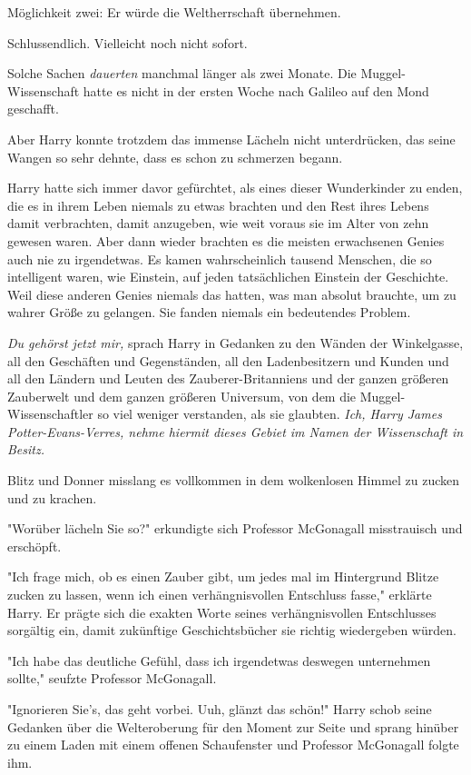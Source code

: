 {Möglichkeit zwei: Er würde die Weltherrschaft übernehmen.

Schlussendlich. Vielleicht noch nicht sofort.

Solche Sachen \emph{dauerten} manchmal länger als zwei Monate. Die Muggel-Wissenschaft hatte es nicht in der ersten Woche nach Galileo auf den Mond geschafft.

Aber Harry konnte trotzdem das immense Lächeln nicht unterdrücken, das seine Wangen so sehr dehnte, dass es schon zu schmerzen begann.

Harry hatte sich immer davor gefürchtet, als eines dieser Wunderkinder zu enden, die es in ihrem Leben niemals zu etwas brachten und den Rest ihres Lebens damit verbrachten, damit anzugeben, wie weit voraus sie im Alter von zehn gewesen waren. Aber dann wieder brachten es die meisten erwachsenen Genies auch nie zu irgendetwas. Es kamen wahrscheinlich tausend Menschen, die so intelligent waren, wie Einstein, auf jeden tatsächlichen Einstein der Geschichte. Weil diese anderen Genies niemals das hatten, was man absolut brauchte, um zu wahrer Größe zu gelangen. Sie fanden niemals ein bedeutendes Problem.

\emph{Du gehörst jetzt mir,} sprach Harry in Gedanken zu den Wänden der Winkelgasse, all den Geschäften und Gegenständen, all den Ladenbesitzern und Kunden und all den Ländern und Leuten des Zauberer-Britanniens und der ganzen größeren Zauberwelt und dem ganzen größeren Universum, von dem die Muggel-Wissenschaftler so viel weniger verstanden, als sie glaubten. \emph{Ich, Harry James Potter-Evans-Verres, nehme hiermit dieses Gebiet im Namen der Wissenschaft in Besitz.}

Blitz und Donner misslang es vollkommen in dem wolkenlosen Himmel zu zucken und zu krachen.

"Worüber lächeln Sie so?" erkundigte sich Professor McGonagall misstrauisch und erschöpft.

"Ich frage mich, ob es einen Zauber gibt, um jedes mal im Hintergrund Blitze zucken zu lassen, wenn ich einen verhängnisvollen Entschluss fasse," erklärte Harry. Er prägte sich die exakten Worte seines verhängnisvollen Entschlusses sorgältig ein, damit zukünftige Geschichtsbücher sie richtig wiedergeben würden.

"Ich habe das deutliche Gefühl, dass ich irgendetwas deswegen unternehmen sollte," seufzte Professor McGonagall.

"Ignorieren Sie's, das geht vorbei. Uuh, glänzt das schön!" Harry schob seine Gedanken über die Welteroberung für den Moment zur Seite und sprang hinüber zu einem Laden mit einem offenen Schaufenster und Professor McGonagall folgte ihm.

}
